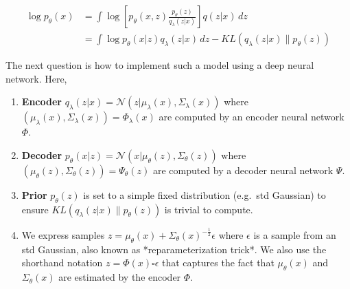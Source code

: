 \begin{align}
  \log p_{\theta}(x) 
  &= \int \log \left[ p_{\theta}(x, z) \frac{p_{\theta}(z)}{q_{\lambda}(z|x)} \right] q(z|x) \,dz \\
  &= \int \log p_{\theta}(x|z)q_{\lambda}(z|x) \,dz - KL(q_{\lambda}(z|x) \| p_{\theta}(z))
\end{align}

The next question is how to implement such a model using a deep neural network. Here,

\begin{enumerate}
  \item \textbf{Encoder} $q_{\lambda}(z|x) = \mathcal{N}(z | \mu_{\lambda}(x), \Sigma_{\lambda}(x))$ where $(\mu_{\lambda}(x),\Sigma_{\lambda}(x)) = \Phi_{\lambda}(x)$ are computed by an encoder neural network $\Phi$.
  \item \textbf{Decoder} $p_{\theta}(x|z) = \mathcal{N}(x | \mu_{\theta}(z), \Sigma_{\theta}(z))$ where $(\mu_{\theta}(z),\Sigma_{\theta}(z)) = \Psi_{\theta}(z)$ are computed by a decoder neural network $\Psi$.
  \item \textbf{Prior} $p_{\theta}(z)$ is set to a simple fixed distribution (e.g.~std Gaussian) to ensure $KL(q_{\lambda}(z|x) \| p_{\theta}(z))$ is trivial to compute.
  \item We express samples $z = \mu_{\theta}(x) + \Sigma_{\theta}(x)^{-\frac{1}{2}} \epsilon$ where $\epsilon$ is a sample from an std Gaussian, also known as *reparameterization trick*. We also use the shorthand notation $z = \Phi(x) \square \epsilon$ that captures the fact that $\mu_{\theta}(x)$ and $\Sigma_{\theta}(x)$ are estimated by the encoder $\Phi$.
  \end{enumerate}









